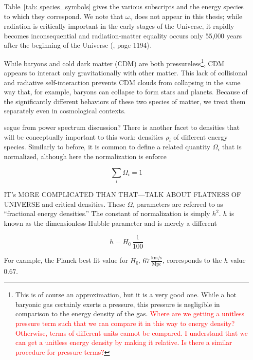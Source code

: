 Table~\ref{tab: species_symbols} gives the various subscripts and the energy species to which
they correspond. We note that $\omega_\gamma$ does not appear in this thesis;
while radiation is critically important in the early stages of the
Universe, it rapidly becomes inconsequential
and radiation-matter equality occurs only 55,000 years after the
beginning of the Universe (, page 1194).

While baryons and cold dark matter (CDM) are both pressureless\footnote{This 
is of
course an approximation, but it is a very good one. While a hot baryonic gas 
certainly exerts a pressure, this pressure is negligible in comparison to the energy density of the gas. \textcolor{red}{Where are we getting a unitless
pressure term such that we can compare it in this way to energy density?
Otherwise, terms of different units cannot be compared. I understand that we
can get a unitless energy density by making it relative. Is there a similar
procedure for pressure terms?}}, CDM appears to interact only gravitationally
with other matter. This lack of collisional and radiative self-interaction
prevents CDM clouds from collapsing in the same way that, for example,
baryons can collapse to form stars and planets. Because of the significantly
different behaviors of these two species of matter, we treat them separately
even in cosmological contexts.

{segue from power spectrum discussion?} There is another facet to densities that will be conceptually important to this work: densities $\rho_i$ of different energy species. Similarly to before, it is common to define a related quantity $\Omega_i$ that is normalized, although here the normalization is enforce

\begin{equation}
\sum_i \Omega_i = 1
\end{equation}

IT’s MORE COMPLICATED THAN THAT—TALK ABOUT FLATNESS OF UNIVERSE and critical densities. These $\Omega_i$ parameters are referred to as “fractional energy densities.” The constant of normalization is simply $h^2$. $h$ is known as
the dimensionless Hubble parameter and is merely a different 

\begin{equation}
h = H_0 \, \frac{1}{100 }
\end{equation}

For example, the Planck best-fit value for $H_0$,
$67 \, \frac{\mathrm{km} / \mathrm{s}}{\mathrm{Mpc}}$,
corresponds to the $h$ value $0.67$. 

